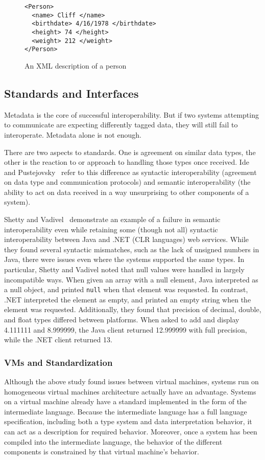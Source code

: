 \documentclass{sig-alternate}
\begin{document}
\begin{figure}
\begin{verbatim}
<Person>
  <name> Cliff </name>
  <birthdate> 4/16/1978 </birthdate>
  <height> 74 </height>
  <weight> 212 </weight>
</Person>
\end{verbatim}
\caption{An XML description of a person}
\label{XMLexample}
\end{figure}

\subsection{Standards and Interfaces}\label{standards}
Metadata is the core of successful interoperability. But if two systems attempting to communicate are expecting differently tagged data, they will still fail to interoperate. Metadata alone is not enough.

There are two aspects to standards. One is agreement on similar data types, the other is the reaction to or approach to handling those types once received. Ide and Pustejovsky~\cite{Ide:2010} refer to this difference as syntactic interoperability (agreement on data type and communication protocols) and semantic interoperability (the ability to act on data received in a way unsurprising to other components of a system).

Shetty and Vadivel~\cite{Shetty:2009} demonstrate an example of a failure in semantic interoperability even while retaining some (though not all) syntactic interoperability between Java and .NET (CLR languages) web services.
While they found several syntactic mismatches, such as the lack of unsigned numbers in Java, there were issues even where the systems supported the same types. In particular, Shetty and Vadivel noted that null values were handled in largely incompatible ways. When given an array with a null element, Java interpreted as a null object, and printed {\tt null} when that element was requested. In contrast, .NET interpreted the element as empty, and printed an empty string when the element was requested. 
Additionally, they found that precision of decimal, double, and float types differed between platforms. When asked to add and display 4.111111 and 8.999999, the Java client returned 12.999999 with full precision, while the .NET client returned 13. 


\subsubsection*{VMs and Standardization}
Although the above study found issues between virtual machines, systems run on homogeneous virtual machines architecture actually have an advantage. Systems on a virtual machine already have a standard implemented in the form of the intermediate language. Because the intermediate language has a full language specification, including both a type system and data interpretation behavior, it can act as a description for required behavior. Moreover, once a system has been compiled into the intermediate language, the behavior of the different components is constrained by that virtual machine's behavior.
\end{document}
